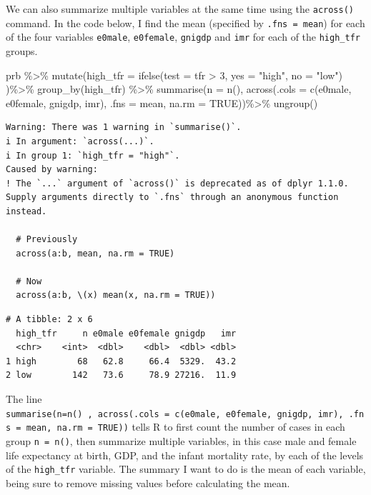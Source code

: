 \documentclass[
  letterpaper,
  DIV=11,
  numbers=noendperiod]{scrreprt}
\newenvironment{Shaded}{\begin{snugshade}}{\end{snugshade}}
\newcommand{\AttributeTok}[1]{\textcolor[rgb]{0.40,0.45,0.13}{#1}}
\newcommand{\ConstantTok}[1]{\textcolor[rgb]{0.56,0.35,0.01}{#1}}
\newcommand{\DecValTok}[1]{\textcolor[rgb]{0.68,0.00,0.00}{#1}}
\newcommand{\FunctionTok}[1]{\textcolor[rgb]{0.28,0.35,0.67}{#1}}
\newcommand{\NormalTok}[1]{\textcolor[rgb]{0.00,0.23,0.31}{#1}}
\newcommand{\SpecialCharTok}[1]{\textcolor[rgb]{0.37,0.37,0.37}{#1}}
\newcommand{\StringTok}[1]{\textcolor[rgb]{0.13,0.47,0.30}{#1}}
\begin{document}
We can also summarize multiple variables at the same time using the
\texttt{across()} command. In the code below, I find the mean (specified
by \texttt{.fns\ =\ mean}) for each of the four variables
\texttt{e0male}, \texttt{e0female}, \texttt{gnigdp} and \texttt{imr} for
each of the \texttt{high\_tfr} groups.

\begin{Shaded}
\begin{Highlighting}[]
\NormalTok{prb }\SpecialCharTok{\%\textgreater{}\%}
  \FunctionTok{mutate}\NormalTok{(}\AttributeTok{high\_tfr =} \FunctionTok{ifelse}\NormalTok{(}\AttributeTok{test =}\NormalTok{ tfr }\SpecialCharTok{\textgreater{}} \DecValTok{3}\NormalTok{,}
                           \AttributeTok{yes =}  \StringTok{"high"}\NormalTok{,}
                           \AttributeTok{no =}  \StringTok{"low"}\NormalTok{) )}\SpecialCharTok{\%\textgreater{}\%}
  \FunctionTok{group\_by}\NormalTok{(high\_tfr) }\SpecialCharTok{\%\textgreater{}\%}
  \FunctionTok{summarise}\NormalTok{(}\AttributeTok{n =} \FunctionTok{n}\NormalTok{(),}
            \FunctionTok{across}\NormalTok{(}\AttributeTok{.cols =} \FunctionTok{c}\NormalTok{(e0male, e0female, gnigdp, imr),}
                   \AttributeTok{.fns =}\NormalTok{ mean,}
                   \AttributeTok{na.rm =} \ConstantTok{TRUE}\NormalTok{))}\SpecialCharTok{\%\textgreater{}\%}
  \FunctionTok{ungroup}\NormalTok{()}
\end{Highlighting}
\end{Shaded}

\begin{verbatim}
Warning: There was 1 warning in `summarise()`.
i In argument: `across(...)`.
i In group 1: `high_tfr = "high"`.
Caused by warning:
! The `...` argument of `across()` is deprecated as of dplyr 1.1.0.
Supply arguments directly to `.fns` through an anonymous function instead.

  # Previously
  across(a:b, mean, na.rm = TRUE)

  # Now
  across(a:b, \(x) mean(x, na.rm = TRUE))
\end{verbatim}

\begin{verbatim}
# A tibble: 2 x 6
  high_tfr     n e0male e0female gnigdp   imr
  <chr>    <int>  <dbl>    <dbl>  <dbl> <dbl>
1 high        68   62.8     66.4  5329.  43.2
2 low        142   73.6     78.9 27216.  11.9
\end{verbatim}

The line
\texttt{summarise(n=n()\ ,\ across(.cols\ =\ c(e0male,\ e0female,\ gnigdp,\ imr),\ .fns\ =\ mean,\ na.rm\ =\ TRUE))}
tells R to first count the number of cases in each group
\texttt{n\ =\ n()}, then summarize multiple variables, in this case male
and female life expectancy at birth, GDP, and the infant mortality rate,
by each of the levels of the \texttt{high\_tfr} variable. The summary I
want to do is the mean of each variable, being sure to remove missing
values before calculating the mean.
\end{document}

